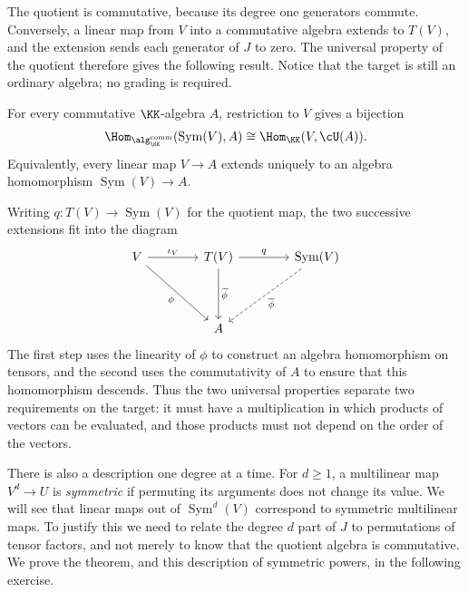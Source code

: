 \documentclass[12pt,reqno]{amsart}
\DeclareMathOperator{\Sym}{Sym}
\begin{document}
The quotient is commutative, because its degree one generators commute. Conversely, a linear map from $V$ into a commutative algebra extends to $T(V)$, and the extension sends each generator of $J$ to zero. The universal property of the quotient therefore gives the following result. Notice that the target is still an ordinary algebra; no grading is required.

\begin{theorem}
For every commutative $\KK$-algebra $A$, restriction to $V$ gives a bijection
\[
\Hom_{\alg_{\KK}^{\mathrm{comm}}}(\Sym(V),A)\cong\Hom_{\KK}(V,\cU(A)).
\]
Equivalently, every linear map $V\to A$ extends uniquely to an algebra homomorphism $\Sym(V)\to A$.
\end{theorem}

Writing $q:T(V)\to\Sym(V)$ for the quotient map, the two successive extensions fit into the diagram
\[
\begin{tikzcd}[row sep=4em,column sep=4em]
V \arrow[r,"\iota_V"] \arrow[dr,"\phi"'] & T(V) \arrow[d,"\widetilde\phi"] \arrow[r,"q"] & \Sym(V) \arrow[dl,dashed,"\overline\phi"] \\
& A &
\end{tikzcd}
\]
The first step uses the linearity of $\phi$ to construct an algebra homomorphism on tensors, and the second uses the commutativity of $A$ to ensure that this homomorphism descends. Thus the two universal properties separate two requirements on the target: it must have a multiplication in which products of vectors can be evaluated, and those products must not depend on the order of the vectors.

There is also a description one degree at a time. For $d\geq1$, a multilinear map $V^d\to U$ is \emph{symmetric} if permuting its arguments does not change its value. We will see that linear maps out of $\Sym^d(V)$ correspond to symmetric multilinear maps. To justify this we need to relate the degree $d$ part of $J$ to permutations of tensor factors, and not merely to know that the quotient algebra is commutative. We prove the theorem, and this description of symmetric powers, in the following exercise.

\hrulefill
\end{document}
